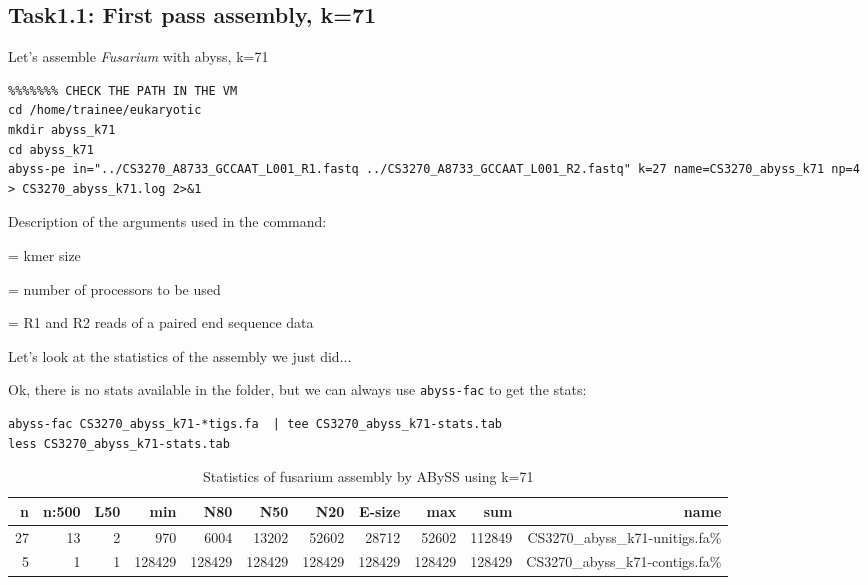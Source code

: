 \subsection{Task1.1: First pass assembly, k=71}

\begin{steps}
Let's assemble \textit{Fusarium} with abyss, k=71
\begin{lstlisting}
%%%%%%% CHECK THE PATH IN THE VM
cd /home/trainee/eukaryotic
mkdir abyss_k71
cd abyss_k71
abyss-pe in="../CS3270_A8733_GCCAAT_L001_R1.fastq ../CS3270_A8733_GCCAAT_L001_R2.fastq" k=27 name=CS3270_abyss_k71 np=4 > CS3270_abyss_k71.log 2>&1
\end{lstlisting}
\end{steps}

Description of the arguments used in the command:
\begin{description}[style=multiline,labelindent=0cm,align=right,leftmargin=\descriptionlabelspace,rightmargin=1.5cm,font=\ttfamily]
  \item[k] = kmer size
  \item[np] = number of processors to be used
  \item[sequence file names] = R1 and R2 reads of a paired end sequence data
\end{description}

\begin{steps}
Let's look at the statistics of the assembly we just did... 

Ok, there is no stats available in the folder, but we can always use \texttt{abyss-fac} to get the stats:
\begin{lstlisting}
abyss-fac CS3270_abyss_k71-*tigs.fa  | tee CS3270_abyss_k71-stats.tab
less CS3270_abyss_k71-stats.tab
\end{lstlisting}
\end{steps}


\begin{table}[H]
  \centering
  \caption{Statistics of fusarium assembly by ABySS using k=71}
    \begin{tabular}{rrrrrrrrrrr}
    \toprule
    \textbf{n} & \textbf{n:500} & \textbf{L50} & \textbf{min} & \textbf{N80}& \textbf{N50}& \textbf{N20}& \textbf{E-size}& \textbf{max} & \textbf{sum}& \textbf{name}\\
    \midrule
    27 & 13 & 2 & 970 & 6004 & 13202 & 52602 & 28712 & 52602 & 112849 & CS3270\_abyss\_k71-unitigs.fa\% \\
    5 & 1 & 1 & 128429 & 128429 & 128429 & 128429 & 128429 & 128429 & 128429 & CS3270\_abyss\_k71-contigs.fa\% \\
    \bottomrule
    \end{tabular}
  \label{tab:fusariumk71}
\end{table}


